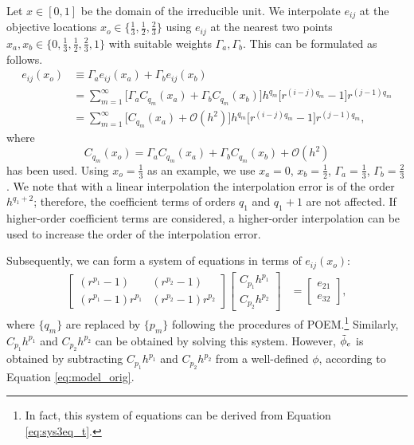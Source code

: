 Let $x \in [0,1]$ be the domain of the irreducible unit. We interpolate $e_{ij}$ at the objective locations $x_o \in \big\{ \frac{1}{3}, \frac{1}{2}, \frac{2}{3} \big\}$ using $e_{ij}$ at the nearest two points $x_a,x_b \in \big\{ 0, \frac{1}{3}, \frac{1}{2}, \frac{2}{3}, 1 \big\}$ with suitable weights $\Gamma_a,\Gamma_b$. This can be formulated as follows.
\begin{align}
    e_{ij}(x_o) &\equiv \Gamma_a e_{ij}(x_a) + \Gamma_b e_{ij}(x_b) \label{eq:eij_extend} \\
    &= \sum_{m=1}^{\infty} \big[ \Gamma_a C_{q_m}(x_a) + \Gamma_b C_{q_m}(x_b) \big] h^{q_m} \big[ r^{(i-j)q_m} - 1 \big] r^{(j-1)q_m} \\
    &= \sum_{m=1}^{\infty} \big[ C_{q_m}(x_a) + \mathcal{O}(h^2) \big] h^{q_m} \big[ r^{(i-j)q_m} - 1 \big] r^{(j-1)q_m},
\end{align}
where 
\begin{equation} \label{eq:C_xo}
    C_{q_m}(x_o) = \Gamma_a C_{q_m}(x_a) + \Gamma_b C_{q_m}(x_b) + \mathcal{O}(h^{2})
\end{equation}
has been used. Using $x_o = \frac{1}{3}$ as an example, we use $x_a = 0$, $x_b = \frac{1}{2}$, $\Gamma_a = \frac{1}{3}$, $\Gamma_b = \frac{2}{3}$. We note that with a linear interpolation the interpolation error is of the order $h^{q_1+2}$; therefore, the coefficient terms of orders $q_1$ and $q_1 + 1$ are not affected. If higher-order coefficient terms are considered, a higher-order interpolation can be used to increase the order of the interpolation error.

Subsequently, we can form a system of equations in terms of $e_{ij}(x_o)$:
\begin{align} \label{eq:sys2eq_x}
    \begin{bmatrix}
        (r^{p_1} - 1) & (r^{p_2} - 1) \\
        (r^{p_1} - 1) r^{p_1} & (r^{p_2} - 1) r^{p_2}
    \end{bmatrix}
    \begin{bmatrix}
        C_{p_1} h^{p_1} \\
        C_{p_2} h^{p_2}
    \end{bmatrix}
    &=
    \begin{bmatrix}
        e_{21} \\
        e_{32}
    \end{bmatrix},
\end{align}
where $\{q_m\}$ are replaced by $\{p_m\}$ following the procedures of POEM.\footnote{In fact, this system of equations can be derived from Equation \ref{eq:sys3eq_t}.} Similarly, $C_{p_1} h^{p_1}$ and $C_{p_2} h^{p_2}$ can be obtained by solving this system. However, $\Tilde{\phi}_{e}$ is obtained by subtracting $C_{p_1} h^{p_1}$ and $C_{p_2} h^{p_2}$ from a well-defined $\phi$, according to Equation \ref{eq:model_orig}.

